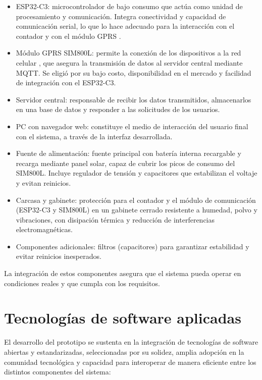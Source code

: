 \begin{itemize}
\item ESP32-C3: microcontrolador de bajo consumo que actúa como unidad de procesamiento y comunicación. Integra conectividad y capacidad de comunicación serial, lo que lo hace adecuado para la interacción con el contador y con el módulo GPRS \cite{esp32c3IDF}.

\item Módulo GPRS SIM800L: permite la conexión de los dispositivos a la red celular \cite{sim800l_datasheet}, que asegura la transmisión de datos al servidor central mediante MQTT. Se eligió por su bajo costo, disponibilidad en el mercado y facilidad de integración con el ESP32-C3.

\item Servidor central: responsable de recibir los datos transmitidos, almacenarlos en una base de datos y responder a las solicitudes de los usuarios.

\item PC con navegador web: constituye el medio de interacción del usuario final con el sistema, a través de la interfaz desarrollada.

\item Fuente de alimentación: fuente principal con batería interna recargable y recarga mediante panel solar, capaz de cubrir los picos de consumo del SIM800L. Incluye regulador de tensión y capacitores que estabilizan el voltaje y evitan reinicios.

\item Carcasa y gabinete: protección para el contador y el módulo de comunicación (ESP32-C3 y SIM800L) en un gabinete cerrado resistente a humedad, polvo y vibraciones, con disipación térmica y reducción de interferencias electromagnéticas.

\item Componentes adicionales: filtros (capacitores) para garantizar estabilidad y evitar reinicios inesperados.


\end{itemize}





La integración de estos componentes asegura que el sistema pueda operar en condiciones reales y que cumpla con los requisitos.


\section{Tecnologías de software aplicadas}
El desarrollo del prototipo se sustenta en la integración de tecnologías de software abiertas y estandarizadas, seleccionadas por su solidez, amplia adopción en la comunidad tecnológica y capacidad para interoperar de manera eficiente entre los distintos componentes del sistema:

